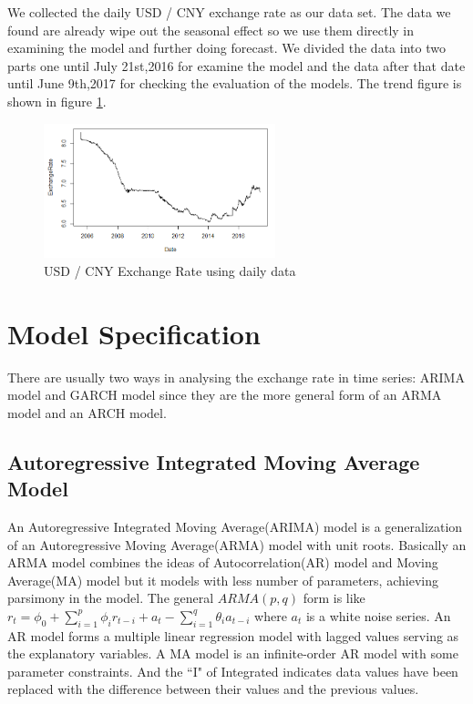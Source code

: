 \documentclass[12pt, a4paper, titlepage]{article}
\begin{document}
We collected the daily USD / CNY exchange rate as our data set. The data we found are already wipe out the seasonal effect so we use them directly in examining the model and further doing forecast. We divided the data into two parts one until July 21st,2016 for examine the model and the data after that date until June 9th,2017 for checking the evaluation of the models. The trend figure is shown in figure \ref{daily}.\\
\begin{figure}
\begin{center}
\caption{USD / CNY Exchange Rate using daily data}\label{daily}
\includegraphics[width=0.6\textwidth]{daily.png} 
\end{center}
\end{figure}

\section{Model Specification}
There are usually two ways in analysing the exchange rate in time series: ARIMA model and GARCH model since they are the more general form of an ARMA model and an ARCH model. 

\subsection{Autoregressive Integrated Moving Average Model}
An Autoregressive Integrated Moving Average(ARIMA) model is a generalization of an Autoregressive Moving Average(ARMA) model with unit roots. Basically an ARMA model combines the ideas of Autocorrelation(AR) model and Moving Average(MA) model but it models with less number of parameters, achieving parsimony in the model. The general $ARMA(p,q)$ form is like $r_t = \phi_0 + \sum_{i=1}^p \phi_i r_{t-i} + a_t - \sum_{i=1}^q \theta_i a_{t-i}$ where ${a_t}$ is a white noise series. An AR model forms a multiple linear regression model with lagged values serving as the explanatory variables. A MA model is an infinite-order AR model with some parameter constraints. And the ``I" of Integrated indicates data values have been replaced with the difference between their values and the previous values.\\
\end{document}

